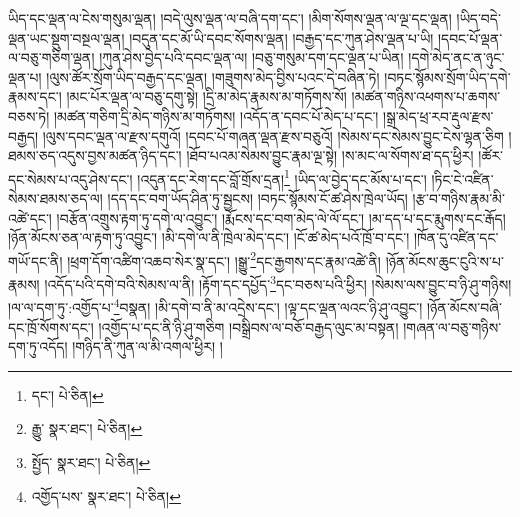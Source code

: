 ཡིད་དང་ལྡན་ལ་ངེས་གསུམ་ལྡན། །བདེ་ལུས་ལྡན་ལ་བཞི་དག་དང་། །མིག་སོགས་ལྡན་ལ་ལྔ་དང་ལྡན། །ཡིད་བདེ་ལྡན་ཡང་སྡུག་བསྔལ་ལྡན། །བདུན་དང་མོ་ཡི་དབང་སོགས་ལྡན། །བརྒྱད་དང་ཀུན་ཤེས་ལྡན་པ་ཡི། །དབང་པོ་ལྡན་ལ་བཅུ་གཅིག་ལྡན། །ཀུན་ཤེས་བྱེད་པའི་དབང་ལྡན་ལ། །བཅུ་གསུམ་དག་དང་ལྡན་པ་ཡིན། །དགེ་མེད་ནང་ན་ཉུང་ལྡན་པ། །ལུས་ཚོར་སྲོག་ཡིད་བརྒྱད་དང་ལྡན། །གཟུགས་མེད་བྱིས་པའང་དེ་བཞིན་ཏེ། །བཏང་སྙོམས་སྲོག་ཡིད་དགེ་རྣམས་དང་། །མང་པོར་ལྡན་ལ་བཅུ་དགུ་སྟེ། །དྲི་མ་མེད་རྣམས་མ་གཏོགས་སོ། །མཚན་གཉིས་འཕགས་པ་ཆགས་བཅས་ཏེ། །མཚན་གཅིག་དྲི་མེད་གཉིས་མ་གཏོགས། །འདོད་ན་དབང་པོ་མེད་པ་དང་། །སྒྲ་མེད་ཕྲ་རབ་རྡུལ་རྫས་བརྒྱད། །ལུས་དབང་ལྡན་ལ་རྫས་དགུའོ། །དབང་པོ་གཞན་ལྡན་རྫས་བཅུའོ། །སེམས་དང་སེམས་བྱུང་ངེས་ལྷན་ཅིག །ཐམས་ཅད་འདུས་བྱས་མཚན་ཉིད་དང་། །ཐོབ་པའམ་སེམས་བྱུང་རྣམ་ལྔ་སྟེ། །ས་མང་ལ་སོགས་ཐ་དད་ཕྱིར། །ཚོར་དང་སེམས་པ་འདུ་ཤེས་དང་། །འདུན་དང་རེག་དང་བློ་གྲོས་དྲན།\footnote{དང་།  པེ་ཅིན། } །ཡིད་ལ་བྱེད་དང་མོས་པ་དང་། །ཏིང་ངེ་འཛིན་སེམས་ཐམས་ཅད་ལ། །དད་དང་བག་ཡོད་ཤིན་ཏུ་སྦྱངས། །བཏང་སྙོམས་ངོ་ཚ་ཤེས་ཁྲེལ་ཡོད། །རྩ་བ་གཉིས་རྣམ་མི་འཚེ་དང་། །བརྩོན་འགྲུས་རྟག་ཏུ་དགེ་ལ་འབྱུང་། །རྨོངས་དང་བག་མེད་ལེ་ལོ་དང་། །མ་དད་པ་དང་རྨུགས་དང་རྒོད། །ཉོན་མོངས་ཅན་ལ་རྟག་ཏུ་འབྱུང་། །མི་དགེ་ལ་ནི་ཁྲེལ་མེད་དང་། །ངོ་ཚ་མེད་པའོ་ཁྲོ་བ་དང་། །ཁོན་དུ་འཛིན་དང་གཡོ་དང་ནི། །ཕྲག་དོག་འཚིག་འཆབ་སེར་སྣ་དང་། །སྒྱུ་\footnote{རྒྱུ་  སྣར་ཐང་།  པེ་ཅིན། }དང་རྒྱགས་དང་རྣམ་འཚེ་ནི། །ཉོན་མོངས་ཆུང་ངུའི་ས་པ་རྣམས། །འདོད་པའི་དགེ་བའི་སེམས་ལ་ནི། །རྟོག་དང་དཔྱོད་\footnote{སྤྱོད་  སྣར་ཐང་།  པེ་ཅིན། }དང་བཅས་པའི་ཕྱིར། །སེམས་ལས་བྱུང་བ་ཉི་ཤུ་གཉིས། །ལ་ལ་དག་ཏུ་:འགྱོད་པ་\footnote{འགྱོད་པས་  སྣར་ཐང་།  པེ་ཅིན། }བསྣན། །མི་དགེ་བ་ནི་མ་འདྲེས་དང་། །ལྟ་དང་ལྡན་ལའང་ཉི་ཤུ་འབྱུང་། །ཉོན་མོངས་བཞི་དང་ཁྲོ་སོགས་དང་། །འགྱོད་པ་དང་ནི་ཉི་ཤུ་གཅིག །བསྒྲིབས་ལ་བཅོ་བརྒྱད་ལུང་མ་བསྟན། །གཞན་ལ་བཅུ་གཉིས་དག་ཏུ་འདོད། །གཉིད་ནི་ཀུན་ལ་མི་འགལ་ཕྱིར། །
